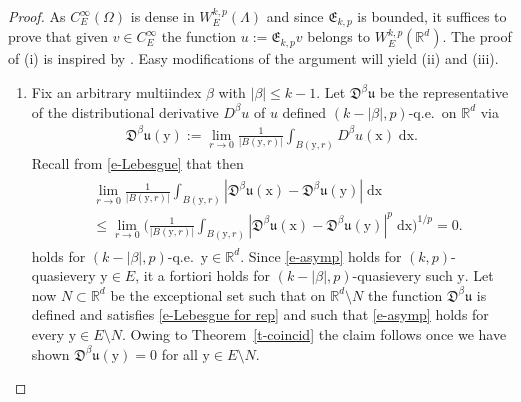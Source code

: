 \documentclass[10pt,leqno]{amsart}
\theoremstyle{definition}
\numberwithin{equation}{section}
\begin{document}
\begin{proof}
As $C_E^\infty(\Omega)$ is dense in $W_E^{k,p}(\Lambda)$ and since
$\mathfrak{E}_{k,p}$ is bounded, it suffices to prove that given $v \in
C_E^\infty$ the function $u:= \mathfrak{E}_{k,p} v$ belongs
to $W_E^{k,p}({{\mathbb R}}^d)$. The proof of (i) is inspired by \cite[pp.\
190-192]{ziemer}. Easy modifications of the argument will yield (ii) and
(iii). 

\begin{enumerate}

\item Fix an arbitrary multiindex $\beta$ with $|\beta|\leq k-1$. Let
  $\mathfrak{D}^\beta {{\mathfrak u}}$ be the representative of the distributional derivative
  $D^\beta u$ of $u$ defined $(k-|\beta|,p)$-q.e.\ on ${{\mathbb R}}^d$ via
  \begin{align*}
  \mathfrak{D}^\beta {{\mathfrak u}}({{\mathrm y}}) := \lim_{r \to 0}
  \frac{1}{|B({{\mathrm y}},r)|}\int_{B({{\mathrm y}},r)}D^\beta u({{\mathrm x}}) \; {{\mathrm d}} {{\mathrm x}}.
  \end{align*}
  Recall from \eqref{e-Lebesgue} that then
  \begin{align}
  \label{e-Lebesgue for rep}
  \begin{split}
  &\lim_{r \to 0} \frac {1}{|B({{\mathrm y}},r)|} \int_{B({{\mathrm y}},r)} |\mathfrak{D}^\beta {{\mathfrak u}}(
  {{\mathrm x}})-\mathfrak{D}^\beta {{\mathfrak u}}({{\mathrm y}})| \; {{\mathrm d}} {{\mathrm x}} \\
  &\leq
  \lim_{r \to 0} \bigg(\frac {1}{|B({{\mathrm y}},r)|} \int_{B({{\mathrm y}},r)} |\mathfrak{D}^\beta
  {{\mathfrak u}}( {{\mathrm x}})-\mathfrak{D}^\beta {{\mathfrak u}}({{\mathrm y}})|^p \; {{\mathrm d}} {{\mathrm x}} \bigg)^{1/p} = 0.
  \end{split}
  \end{align}
  holds for $(k-|\beta|,p)$-q.e.\ ${{\mathrm y}} \in {{\mathbb R}}^d$. Since \eqref{e-asymp} holds for
  $(k,p)$-quasievery ${{\mathrm y}} \in E$, it a fortiori holds for
  $(k-|\beta|,p)$-quasievery such ${{\mathrm y}}$. Let now $N \subset {{\mathbb R}}^d$ be the
  exceptional set such that on ${{\mathbb R}}^d \setminus N$ the function
  $\mathfrak{D}^\beta {{\mathfrak u}}$ is defined and satisfies \eqref{e-Lebesgue for rep}
  and such that \eqref{e-asymp} holds for every ${{\mathrm y}} \in E \setminus N$. Owing to
  Theorem~\ref{t-coincid} the claim follows once we have shown
  $\mathfrak{D}^\beta  {{\mathfrak u}}({{\mathrm y}}) = 0$ for all ${{\mathrm y}} \in E \setminus N$. 


\end{enumerate}
\end{proof}
\end{document}

